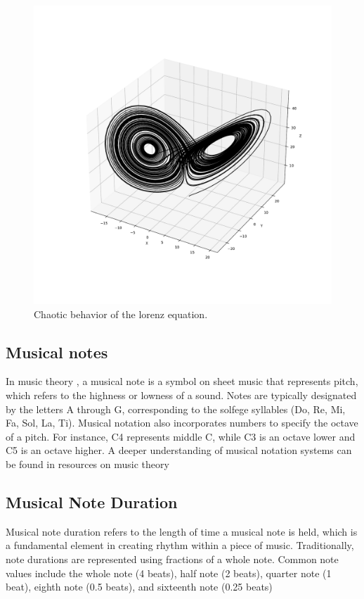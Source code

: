\documentclass[11pt]{article}
\theoremstyle{definition}
\begin{document}
\begin{figure}
\centering
\includegraphics[trim=2cm 2cm 2cm 2cm, clip, scale=0.3]{Lorenz.pdf}
\caption{Chaotic behavior of the lorenz equation.}
\label{fig:LE}
\end{figure}

\subsection{Musical notes}
In music theory \cite{carter_music_2016}, a musical note is a symbol on sheet music that represents pitch, which refers to the highness or lowness of a sound.  Notes are typically designated by the letters A through G, corresponding to the solfege syllables (Do, Re, Mi, Fa, Sol, La, Ti).  Musical notation also incorporates numbers to specify the octave of a pitch. For instance, C4 represents middle C, while C3 is an octave lower and C5 is an octave higher. A deeper understanding of musical notation systems can be found in resources on music theory

\subsection{Musical Note Duration}
Musical note duration refers to the length of time a musical note is held, which is a fundamental element in creating rhythm within a piece of music.  Traditionally, note durations are represented using fractions of a whole note. Common note values include the whole note (4 beats), half note (2 beats), quarter note (1 beat), eighth note (0.5 beats), and sixteenth note (0.25 beats)
\end{document}
